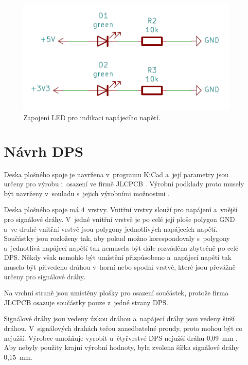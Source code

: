   \begin{figure}[!h]
    \begin{center}
      \includegraphics[scale=0.6]{obrazky/powerLED.png}
    \end{center}
    \caption[Zapojení LED pro indikaci napájecího napětí]{Zapojení LED pro indikaci napájecího napětí.}
  \end{figure}

  \chapter{Návrh DPS}
  Deska plošného spoje je navržena v~programu KiCad a~její parametry jsou určeny pro výrobu i~osazení ve firmě JLCPCB \cite{KiCad} \cite{JLCPCB}. Výrobní 
  podklady proto musely být navrženy v~souladu s~jejich výrobními možnostmi \cite{JLCPCB_Capabilities}.

  Deska plošného spoje má 4~vrstvy. Vnitřní vrstvy slouží pro napájení a~vnější pro signálové dráhy. V~jedné vnitřní vrstvě je po celé její ploše 
  polygon GND a~ve druhé vnitřní vrstvě jsou polygony jednotlivých napájecích napětí. Součástky jsou rozloženy tak, aby pokud možno
  korespondovaly s~polygony a~jednotlivá napájecí napětí tak nemusela být dále rozváděna zbytečně po celé DPS. Někdy však nemohlo být umístění 
  přizpůsobeno a~napájecí napětí tak muselo být přivedeno dráhou v~horní nebo spodní vrstvě, které jsou převážně určeny pro signálové 
  dráhy. 

  Na vrchní straně jsou umístěny plošky pro osazení součástek, protože firma JLCPCB osazuje součástky pouze z~jedné strany DPS.

  Signálové dráhy jsou vedeny úzkou dráhou a~napájecí dráhy jsou vedeny širší dráhou. V~signálových drahách tečou zanedbatelné 
  proudy, proto mohou být co nejužší. Výrobce umožňuje vyrobit u~čtyřvrstvé DPS nejužší dráhu 0,09~mm \cite{JLCPCB_Capabilities}. 
  Aby nebyly použity krajní výrobní hodnoty, byla zvolena šířka signálové dráhy 0,15~mm.

